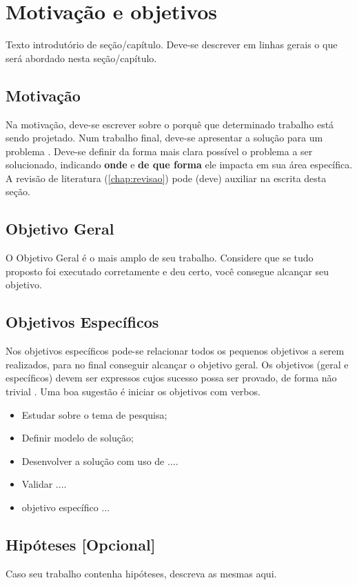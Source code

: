 \chapter{Motivação e objetivos}\label{chap:problema}
    Texto introdutório de seção/capítulo. Deve-se descrever em linhas gerais o que será abordado nesta seção/capítulo.

\section{Motivação}
    Na motivação, deve-se escrever sobre o porquê que determinado trabalho está sendo projetado. Num trabalho final, deve-se apresentar a solução para um problema \citep{WAZLAWICK2020}.  Deve-se definir da forma mais clara possível o problema a ser solucionado, indicando \textbf{onde} e \textbf{de que forma} ele impacta em sua área específica. A revisão de literatura (\cref{chap:revisao}) pode (deve) auxiliar na escrita desta seção. 
    
\section{Objetivo Geral}\label{sec:obj_geral}

O Objetivo Geral é o mais amplo de seu trabalho. Considere que se tudo proposto foi executado corretamente e deu certo, você consegue alcançar seu objetivo. 

\section{Objetivos Específicos}\label{sec:obj_espec}
Nos objetivos específicos pode-se relacionar todos os pequenos objetivos a serem realizados, para no final conseguir alcançar o objetivo geral. Os objetivos (geral e específicos) devem ser expressos cujos sucesso possa ser provado, de forma não trivial \cite{WAZLAWICK2020}. Uma boa sugestão é iniciar os objetivos com verbos.
\begin{itemize}[leftmargin=5em]
    \item Estudar sobre o tema de pesquisa;
    \item Definir modelo de solução;
    \item Desenvolver a solução com uso de ....
    \item Validar ....
    \item objetivo específico ...
\end{itemize}    

\section{Hipóteses [Opcional]}\label{sec:hipoteses}
Caso seu trabalho contenha hipóteses, descreva as mesmas aqui.
    


